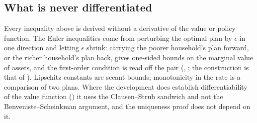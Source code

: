 \subsection{What is never differentiated}\label{sec:deriv}

Every inequality above is derived without a derivative of the value or policy function. The Euler
inequalities come from perturbing the optimal plan by $\epsilon$ in one direction and letting
$\epsilon$ shrink: carrying the poorer household's plan forward, or the richer household's plan
back, gives one-sided bounds on the marginal value of assets, and the first-order condition is read
off the pair (, ; the construction is that of
\citealp{ClausenStrub2020}). Lipschitz constants are secant bounds; monotonicity in the rate is a
comparison of two plans. Where the development does establish differentiability of the value
function () it uses the Clausen--Strub sandwich and not the
Benveniste--Scheinkman argument, and the uniqueness proof does not depend on it.
